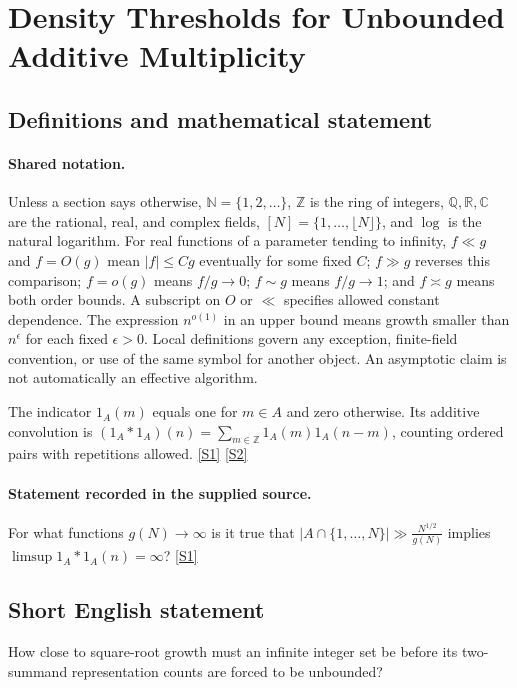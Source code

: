 \documentclass[11pt,a4paper]{article}
\newcommand{\N}{\mathbb{N}}
\newcommand{\Z}{\mathbb{Z}}
\newcommand{\Q}{\mathbb{Q}}
\newcommand{\R}{\mathbb{R}}
\newcommand{\C}{\mathbb{C}}
\newcommand{\sref}[2]{\hyperlink{source:#1:#2}{[S#2]}}
\begin{document}
\section{Density Thresholds for Unbounded Additive Multiplicity}\label{statement}


\subsection{Definitions and mathematical statement}

\paragraph{Shared notation.}Unless a section says otherwise, $\N=\{1,2,\ldots\}$,
$\Z$ is the ring of integers, $\Q,\R,\C$ are the rational, real, and complex
fields, $[N]=\{1,\ldots,\lfloor N\rfloor\}$, and $\log$ is the natural
logarithm. For real functions of a parameter tending to infinity,
$f\ll g$ and $f=O(g)$ mean $|f|\leq Cg$ eventually for some fixed $C$;
$f\gg g$ reverses this comparison; $f=o(g)$ means $f/g\to0$;
$f\sim g$ means $f/g\to1$; and $f\asymp g$ means both order bounds.
A subscript on $O$ or $\ll$ specifies allowed constant dependence.
The expression $n^{o(1)}$ in an upper bound means growth smaller than
$n^\epsilon$ for each fixed $\epsilon>0$. Local definitions govern any
exception, finite-field convention, or use of the same symbol for another
object. An asymptotic claim is not automatically an effective algorithm.



The indicator $1_A(m)$ equals one for $m\in A$ and zero otherwise. Its additive convolution is $(1_A*1_A)(n)=\sum_{m\in\Z}1_A(m)1_A(n-m)$, counting ordered pairs with repetitions allowed. \sref{statement}{1} \sref{statement}{2}

\paragraph{Statement recorded in the supplied source.}
For what functions $g(N)\to \infty$ is it true that $ \lvert A\cap \{1,\ldots,N\}\rvert \gg \frac{N^{1/2}}{g(N)} $ implies $\limsup 1_A\ast 1_A(n)=\infty$? \sref{statement}{1}

\subsection{Short English statement}

How close to square-root growth must an infinite integer set be before its two-summand representation counts are forced to be unbounded?
\end{document}
